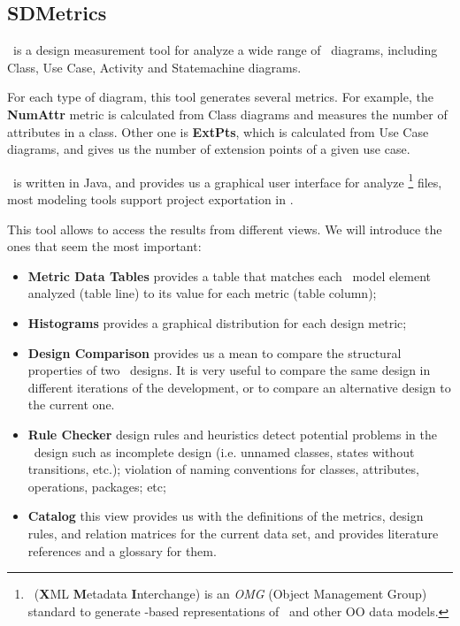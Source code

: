 \subsection{SDMetrics}
\sdmetrics\ is a design measurement tool for analyze a wide range of \uml\ diagrams, including Class, Use Case, Activity and Statemachine diagrams.

For each type of diagram, this tool generates several metrics.
For example, the \textbf{NumAttr} metric is calculated from Class diagrams and measures the number of attributes in a class.
Other one is \textbf{ExtPts}, which is calculated from Use Case diagrams, and gives us the number of extension points of a given use case.

\sdmetrics\ is written in \textsf{Java}, and provides us a graphical user interface for analyze \xmi\footnote{
\xmi\ (\textbf{X}ML \textbf{M}etadata \textbf{I}nterchange)  is an \emph{OMG} (Object Management Group) standard to generate \xml-based representations of \uml\ and other OO data models.} 
files, most modeling tools support project exportation in \xmi.

This tool allows to access the results from different views. We will introduce the ones that seem the most important:
\begin{itemize}

\item \textbf{Metric Data Tables} provides a table that matches each \uml\ model element analyzed (table line) to its value for each metric (table column);
\item \textbf{Histograms} provides a graphical distribution  for each design metric;
\item \textbf{Design Comparison} provides us a mean to compare the structural properties of two \uml\ designs. It is very useful to compare the same design in different iterations of the development, or to compare an alternative design to the current one.
\item \textbf{Rule Checker} design rules and heuristics detect potential problems in the \uml\ design such as incomplete design (i.e. unnamed classes, states without transitions, etc.);  violation of naming conventions for classes, attributes, operations, packages; etc;

\item \textbf{Catalog} this view provides us with the definitions of the metrics, design rules, and relation matrices for the current data set, and provides literature references and a glossary for them.
\end{itemize}

